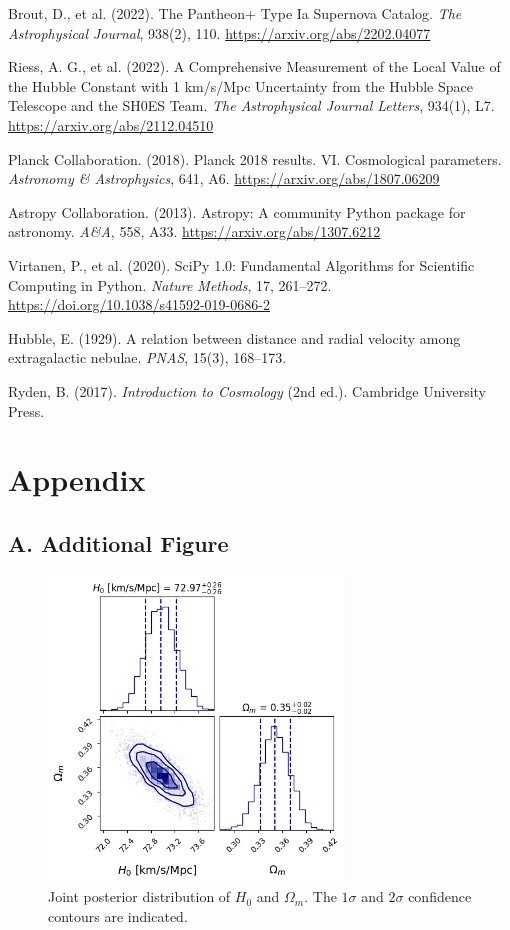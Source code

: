 \documentclass[12pt]{article}
\begin{document}
\newpage
\begin{thebibliography}{9}
Brout, D., et al. (2022). The Pantheon+ Type Ia Supernova Catalog. \textit{The Astrophysical Journal}, 938(2), 110. \url{https://arxiv.org/abs/2202.04077}

Riess, A. G., et al. (2022). A Comprehensive Measurement of the Local Value of the Hubble Constant with 1 km/s/Mpc Uncertainty from the Hubble Space Telescope and the SH0ES Team. 
\textit{The Astrophysical Journal Letters}, 934(1), L7. \url{https://arxiv.org/abs/2112.04510}

Planck Collaboration. (2018). Planck 2018 results. VI. Cosmological parameters. \textit{Astronomy \& Astrophysics}, 641, A6. \url{https://arxiv.org/abs/1807.06209}

Astropy Collaboration. (2013). Astropy: A community Python package for astronomy. \textit{A\&A}, 558, A33. \url{https://arxiv.org/abs/1307.6212}

Virtanen, P., et al. (2020). SciPy 1.0: Fundamental Algorithms for Scientific Computing in Python. \textit{Nature Methods}, 17, 261--272. \url{https://doi.org/10.1038/s41592-019-0686-2}

Hubble, E. (1929). A relation between distance and radial velocity among extragalactic nebulae. \textit{PNAS}, 15(3), 168--173.

Ryden, B. (2017). \textit{Introduction to Cosmology} (2nd ed.). Cambridge University Press.
\end{thebibliography}
\newpage
\appendix
\section*{Appendix}
\subsection*{A. Additional Figure}

\begin{figure}[H]
    \centering
    \includegraphics[width=0.7\textwidth]{corner.png}
    \caption{Joint posterior distribution of $H_0$ and $\Omega_m$. 
    The $1\sigma$ and $2\sigma$ confidence contours are indicated.}
\end{figure}
\end{document}
